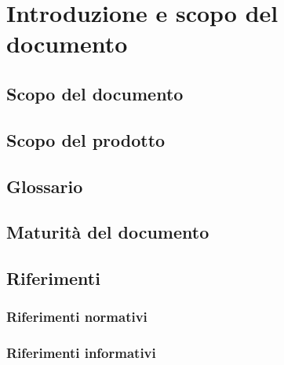 \section{Introduzione e scopo del documento}

    \subsection{Scopo del documento}

    \subsection{Scopo del prodotto}

    \subsection{Glossario}

    \subsection{Maturità del documento}

    \subsection{Riferimenti}

        \subsubsection{Riferimenti normativi}

        \subsubsection{Riferimenti informativi}
